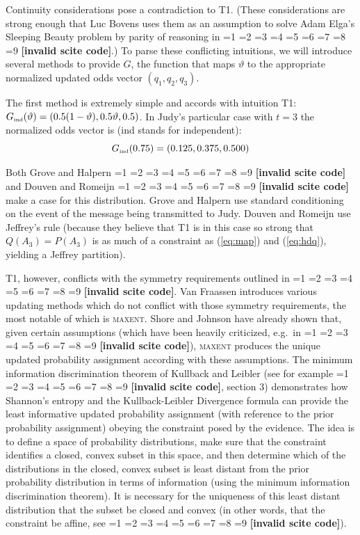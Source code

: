 \documentclass[smallextended]{svjour3}       %
\newcommand{\nial}{\noindent} %
\newcommand{\qvu}[0]{\vartheta}
\newcommand{\PageP}{p.~}
\newcommand{\PageP}{}
\newcommand{\scite}[3]{\ifnum#1=1\cite{#2}\else
\ifnum#1=2\cite[{\PageP}~#3]{#2}\else
\ifnum#1=3\cite[{\PageP}~#3]{#2}\else
\ifnum#1=4\cite{#2}\else
\ifnum#1=5\cite{#2}\else
\ifnum#1=6\cite[{\PageP}~#3]{#2}\else
\ifnum#1=7\cite{#2}\else
\ifnum#1=8\cite[{\PageP}~#3]{#2}\else
\ifnum#1=9\cite[{\PageP}~#3]{#2}\else
\textbf{[invalid scite code]}\fi\fi\fi\fi\fi\fi\fi\fi\fi}
\begin{document}
\nial Continuity considerations pose a contradiction to T1. (These
considerations are strong enough that Luc Bovens uses them as an
assumption to solve Adam Elga's Sleeping Beauty problem by parity of
reasoning in \scite{7}{bovens10}{}.) To parse these conflicting
intuitions, we will introduce several methods to provide $G$, the
function that maps ${\qvu}$ to the appropriate normalized updated odds
vector $(q_{1},q_{2},q_{3})$. 

The first method is extremely simple and accords with intuition T1:
$G_{\mbox{{\tiny ind}}}({\qvu})=(0.5(1-{\qvu}),0.5{\qvu},0.5)$. In
Judy's particular case with $t=3$ the normalized odds vector is (ind
stands for independent):
\begin{displaymath}
  G_{\mbox{{\tiny ind}}}(0.75)=(0.125,0.375,0.500)
\end{displaymath}

\nial Both Grove and Halpern \scite{1}{grovehalpern97}{} and Douven
and Romeijn \scite{1}{douvenromeijn09}{} make a case for this
distribution. Grove and Halpern use standard conditioning on the event
of the message being transmitted to Judy. Douven and Romeijn use
Jeffrey's rule (because they believe that T1 is in this case so strong
that $Q(A_{3})=P(A_{3})$ is as much of a constraint as (\ref{eq:map})
and (\ref{eq:hdq}), yielding a Jeffrey partition). 

T1, however, conflicts with the symmetry requirements outlined in
\scite{1}{fraassenetal86}{}. Van Fraassen introduces various updating
methods which do not conflict with those symmetry requirements, the
most notable of which is \textsc{maxent}. Shore and Johnson have
already shown that, given certain assumptions (which have been heavily
criticized, e.g.\ in \scite{7}{uffink96}{}), \textsc{maxent} produces
the unique updated probability assignment according with these
assumptions. The minimum information discrimination theorem of
Kullback and Leibler (see for example \scite{7}{csiszar67}{}, section
3) demonstrates how Shannon's entropy and the Kullback-Leibler
Divergence formula can provide the least informative updated
probability assignment (with reference to the prior probability
assignment) obeying the constraint posed by the evidence. The idea is
to define a space of probability distributions, make sure that the
constraint identifies a closed, convex subset in this space, and then
determine which of the distributions in the closed, convex subset is
least distant from the prior probability distribution in terms of
information (using the minimum information discrimination theorem). It
is necessary for the uniqueness of this least distant distribution
that the subset be closed and convex (in other words, that the
constraint be affine, see \scite{7}{csiszar67}{}).
\end{document}
